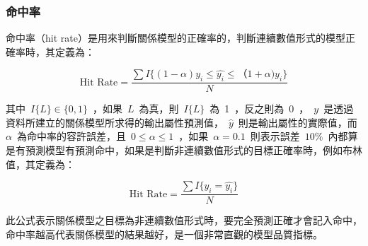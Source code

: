 \subsubsection{命中率}

命中率（hit rate）是用來判斷關係模型的正確率的，判斷連續數值形式的模型正確率時，其定義為：

\begin{equation} \text{Hit Rate} = \dfrac{ \sum{I\{(1 - \alpha)y_i \le \hat{y_i} \le（1 + \alpha)y_i \}} }{N} \label{eq:hitratenum}\end{equation} 

其中~$I\{L\} \in \{0, 1\}$~，如果~$L$~為真，則~$I\{L\}$~為~1~，反之則為~0~，~$y$~是透過資料所建立的關係模型所求得的輸出屬性預測值，~$\hat{y}$~則是輸出屬性的實際值，而~$\alpha$~為命中率的容許誤差，且~$0 \le \alpha \le 1$~，如果~$\alpha = 0.1$~則表示誤差~$10\%$~內都算是有預測模型有預測命中，如果是判斷非連續數值形式的目標正確率時，例如布林值，其定義為：

\begin{equation} \text{Hit Rate} = \dfrac{ \sum{I\{y_i = \hat{y_i}\}} }{N} \label{eq:hitrate}\end{equation} 

此公式表示關係模型之目標為非連續數值形式時，要完全預測正確才會記入命中，命中率越高代表關係模型的結果越好，是一個非常直觀的模型品質指標。

